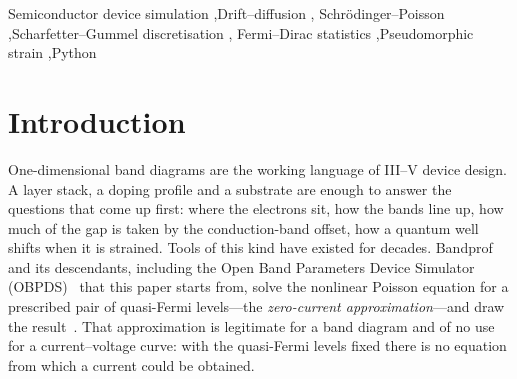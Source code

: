 \documentclass[preprint,12pt]{elsarticle}
\newcounter{bla}
\newenvironment{refnummer}{%
\list{[\arabic{bla}]}%
{\usecounter{bla}%
 \setlength{\itemindent}{0pt}%
 \setlength{\topsep}{0pt}%
 \setlength{\itemsep}{0pt}%
 \setlength{\labelsep}{2pt}%
 \setlength{\listparindent}{0pt}%
 \settowidth{\labelwidth}{[9]}%
 \setlength{\leftmargin}{\labelwidth}%
 \addtolength{\leftmargin}{\labelsep}%
 \setlength{\rightmargin}{0pt}}}
 {\endlist}
\begin{document}
\begin{frontmatter}
\begin{abstract}
\begin{small}
\begin{refnummer}
\item D.~L. Scharfetter, H.~K. Gummel, IEEE Trans.\ Electron Devices 16 (1969)
      64--77.
\item H.~K. Gummel, IEEE Trans.\ Electron Devices 11 (1964) 455--465.
\item R.~E. Bank, D.~J. Rose, Numer.\ Math.\ 37 (1981) 279--295.
\item I.~Vurgaftman, J.~R. Meyer, L.~R. Ram-Mohan, J.\ Appl.\ Phys.\ 89 (2001)
      5815--5875.
\item S.~L. Chuang, Phys.\ Rev.\ B 43 (1991) 9649--9661.
\item D.~J. BenDaniel, C.~B. Duke, Phys.\ Rev.\ 152 (1966) 683--692.
\end{refnummer}
\end{small}
\end{abstract}

\begin{keyword}
Semiconductor device simulation \sep Drift--diffusion \sep
Schr\"odinger--Poisson \sep Scharfetter--Gummel discretisation \sep
Fermi--Dirac statistics \sep Pseudomorphic strain \sep Python
\end{keyword}

\end{frontmatter}

\section{Introduction}
\label{sec:intro}

One-dimensional band diagrams are the working language of III--V device
design. A layer stack, a doping profile and a substrate are enough to answer
the questions that come up first: where the electrons sit, how the bands line
up, how much of the gap is taken by the conduction-band offset, how a quantum
well shifts when it is strained. Tools of this kind have existed for decades.
Bandprof~\cite{Frensley} and its descendants, including the Open Band
Parameters Device Simulator (OBPDS)~\cite{Maddox2015} that this paper starts
from, solve the nonlinear Poisson equation for a prescribed pair of
quasi-Fermi levels---the \emph{zero-current approximation}---and draw the
result~\cite{Frensley1988}. That approximation is legitimate for a band diagram and of no use for a
current--voltage curve: with the quasi-Fermi levels fixed there is no equation
from which a current could be obtained.
\end{document}
